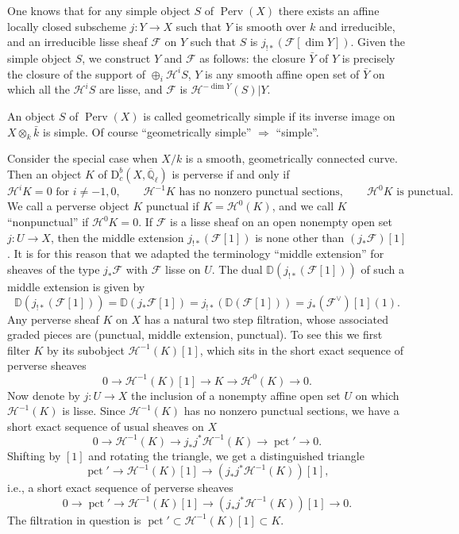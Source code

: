 One knows that for any simple object \(S\) of \(\operatorname{Perv}(X)\) there
exists an affine locally closed subscheme \(j:Y\to X\) such that \(Y\) is
smooth over \(k\) and irreducible, and an irreducible lisse sheaf
\(\mathcal{F}\) on \(Y\) such that
\(S\) is \(j_{!*}(\mathcal{F}[\dim Y])\). Given the simple object \(S\), we
construct \(Y\) and \(\mathcal{F}\) as follows: the closure \(\bar{Y}\) of
\(Y\) is precisely the closure of the support of
\(\oplus_i\mathcal{H}^iS\), \(Y\) is any smooth affine open set of \(\bar{Y}\)
on which all the \(\mathcal{H}^iS\) are lisse, and \(\mathcal{F}\) is
\(\mathcal{H}^{-\dim Y}(S)|Y\).

An object \(S\) of \(\operatorname{Perv}(X)\) is called geometrically simple if
its inverse image on \(X\otimes_k\bar{k}\) is simple. Of course
``geometrically simple'' \(\Rightarrow\) ``simple''.

Consider the special case when \(X/k\) is a smooth, geometrically connected
curve. Then an object \(K\) of
\(\mathrm{D}^b_c(X,\overline{\mathbb{Q}}_\ell)\) is perverse if and only if
\[
  \mathcal{H}^iK=0\text{ for }i\neq -1,0,\qquad
  \mathcal{H}^{-1}K\text{ has no nonzero punctual sections},\qquad
  \mathcal{H}^0K\text{ is punctual}.
\]
We call a perverse object \(K\) punctual if \(K=\mathcal{H}^0(K)\), and we
call \(K\) ``nonpunctual'' if \(\mathcal{H}^0K=0\). If \(\mathcal{F}\) is a
lisse sheaf on an open nonempty open set \(j:U\to X\), then the middle
extension \(j_{!*}(\mathcal{F}[1])\) is none other than
\((j_*\mathcal{F})[1]\). It is for this reason that we adapted the terminology
``middle extension'' for sheaves of the type \(j_*\mathcal{F}\) with
\(\mathcal{F}\) lisse on \(U\). The dual
\(\mathbb{D}(j_{!*}(\mathcal{F}[1]))\) of such a middle extension is given by
\[
  \mathbb{D}(j_{!*}(\mathcal{F}[1]))
  =\mathbb{D}(j_*\mathcal{F}[1])
  =j_{!*}(\mathbb{D}(\mathcal{F}[1]))
  =j_*(\mathcal{F}^{\vee})[1](1).
\]
Any perverse sheaf \(K\) on \(X\) has a natural two step filtration, whose
associated graded pieces are (punctual, middle extension, punctual). To see
this we first filter \(K\) by its subobject \(\mathcal{H}^{-1}(K)[1]\), which
sits in the short exact sequence of perverse sheaves
\[
  0\to\mathcal{H}^{-1}(K)[1]\to K\to\mathcal{H}^0(K)\to0.
\]
Now denote by \(j:U\to X\) the inclusion of a nonempty affine open set \(U\) on
which \(\mathcal{H}^{-1}(K)\) is lisse. Since \(\mathcal{H}^{-1}(K)\) has no
nonzero punctual sections, we have a short exact sequence of usual sheaves on
\(X\)
\[
  0\to\mathcal{H}^{-1}(K)\to j_*j^*\mathcal{H}^{-1}(K)\to \operatorname{pct}'\to0.
\]
Shifting by \([1]\) and rotating the triangle, we get a distinguished triangle
\[
  \operatorname{pct}'\to\mathcal{H}^{-1}(K)[1]\to
  (j_*j^*\mathcal{H}^{-1}(K))[1],
\]
i.e., a short exact sequence of perverse sheaves
\[
  0\to\operatorname{pct}'\to\mathcal{H}^{-1}(K)[1]\to
  (j_*j^*\mathcal{H}^{-1}(K))[1]\to0.
\]
The filtration in question is
\(\operatorname{pct}'\subset\mathcal{H}^{-1}(K)[1]\subset K\).


